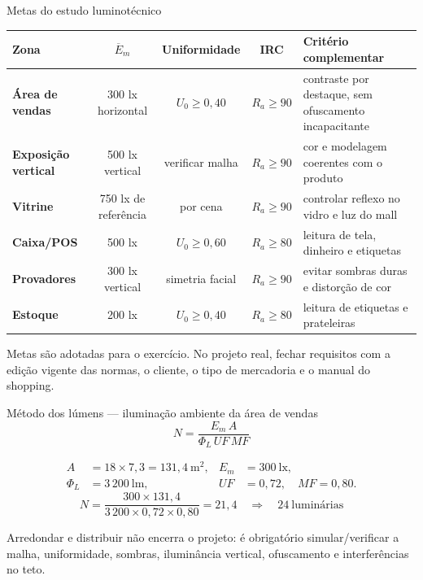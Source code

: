 \begin{frame}{Metas do estudo luminotécnico}
\scriptsize
\begin{tabularx}{\textwidth}{>{\bfseries}p{2.45cm}c c c X}
\toprule
Zona & $\overline{E}_m$ & Uniformidade & IRC & Critério complementar \\
\midrule
Área de vendas & 300 lx horizontal & $U_0\geq0{,}40$ & $R_a\geq90$ & contraste por destaque, sem ofuscamento incapacitante \\
Exposição vertical & 500 lx vertical & verificar malha & $R_a\geq90$ & cor e modelagem coerentes com o produto \\
Vitrine & 750 lx de referência & por cena & $R_a\geq90$ & controlar reflexo no vidro e luz do mall \\
Caixa/POS & 500 lx & $U_0\geq0{,}60$ & $R_a\geq80$ & leitura de tela, dinheiro e etiquetas \\
Provadores & 300 lx vertical & simetria facial & $R_a\geq90$ & evitar sombras duras e distorção de cor \\
Estoque & 200 lx & $U_0\geq0{,}40$ & $R_a\geq80$ & leitura de etiquetas e prateleiras \\
\bottomrule
\end{tabularx}
\begin{caixaAt}
Metas são adotadas para o exercício. No projeto real, fechar requisitos com a edição vigente das normas, o cliente, o tipo de mercadoria e o manual do shopping.
\end{caixaAt}
\end{frame}

\begin{frame}{Método dos lúmens — iluminação ambiente da área de vendas}
\small
\[
N=\frac{E_m\,A}{\Phi_L\,UF\,MF}
\]
\begin{caixaEx}[title=Premissas do estudo]
\begin{align*}
A&=18\times7{,}3=131{,}4\ \mathrm{m^2}, & E_m&=300\ \mathrm{lx},\\
\Phi_L&=3\,200\ \mathrm{lm}, & UF&=0{,}72,\quad MF=0{,}80.
\end{align*}
\[
N=\frac{300\times131{,}4}{3\,200\times0{,}72\times0{,}80}=21{,}4
\quad\Longrightarrow\quad \boxed{24\ \text{luminárias}}
\]
\end{caixaEx}
\begin{caixaObs}
Arredondar e distribuir não encerra o projeto: é obrigatório simular/verificar a malha, uniformidade, sombras, iluminância vertical, ofuscamento e interferências no teto.
\end{caixaObs}
\end{frame}

